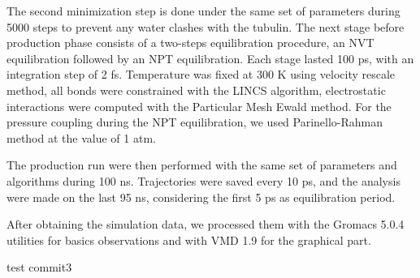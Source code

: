 \documentclass[a4paper]{article}
\begin{document}
The second minimization step is done under the same set of parameters during 5000 steps to prevent any water
clashes with the tubulin. The next stage before production phase consists of a two-steps equilibration procedure,
an NVT equilibration followed by an NPT equilibration. Each stage lasted 100 ps, with an integration step of 2 fs.
Temperature was fixed at 300 K using velocity rescale method, all bonds were constrained with the LINCS algorithm,
electrostatic interactions were computed with the Particular Mesh Ewald method. For the pressure coupling during
the NPT equilibration, we used Parinello-Rahman method at the value of 1 atm.

The production run were then performed with the same set of parameters and algorithms during 100 ns. Trajectories
were saved every 10 ps, and the analysis were made on the last 95 ns, considering the first 5 ps as equilibration
period.

After obtaining the simulation data, we processed them with the Gromacs 5.0.4 utilities for basics observations and with
VMD 1.9 for the graphical part.

test commit3
\end{document}

